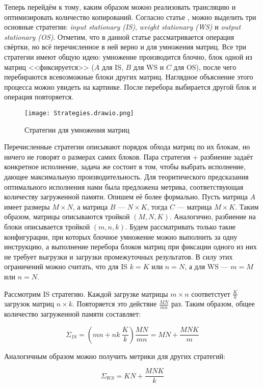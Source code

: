Теперь перейдём к тому, каким образом можно реализовать трансляцию и
оптимизировать количество копирований. Согласно статье \cite{matmul-strategies}, можно выделить
три основные стратегии: \textit{input stationary (IS)}, \textit{weight stationary (WS)}
и \textit{output stationary (OS)}. Отметим, что в данной статье рассматривается
операция свёртки, но всё перечисленное в ней верно и для умножения матриц.
Все три стратегии имеют общую идею: умножение производится блочно, блок одной из
матриц <<фиксируется>> ($A$ для IS, $B$ для WS и $C$ для OS), после чего
перебираются всевозможные блоки других матриц. Наглядное объяснение этого
процесса можно увидеть на картинке. После перебора выбирается другой блок и
операция повторяется.

\begin{figure}[h!]
    \centering
    \texttt{[image: Strategies.drawio.png]}
    \caption{Стратегии для умножения матриц}
\end{figure}

Перечисленные стратегии описывают порядок обхода матриц по их блокам, но ничего
не говорят о размерах самих блоков. Пара стратегия + разбиение задаёт конкретное
исполнение, задача же состоит в том, чтобы выбрать исполнение, дающее
максимальную производительность. Для теоритического предсказания оптимального
исполнения нами была предложена метрика, соответствующая количеству загруженной
памяти. Опишем её более формально. Пусть матрица $A$ имеет размеры $M \times N$, а
матрица $B$ --- $N \times K$, тогда $C$ --- матрица $M \times K$. Таким образом,
матрицы описываются тройкой $(M, N, K)$. Аналогично, разбиение на блоки
описывается тройкой $(m, n, k)$. Будем рассматривать только такие конфигурации,
при которых блочное умножение можно выполнить за одну инструкцию, а выполнение
перебора блоков матриц при фиксации одного из них не требует выгрузки и загрузки
промежуточных результатов. В силу этих ограничений можно считать, что для IS
$k = K$ или $n = N$, а для WS --- $m = M$ или $n = N$.

Рассмотрим IS стратегию. Каждой загрузке матрицы $m \times n$ соответстует
$\frac{K}{k}$ загрузок матриц $n \times k$. Повторяется это действие
$\frac{MN}{mn}$ раз. Таким образом, общее количество загруженной памяти
составляет:

\[
    \Sigma_{IS} = \left( mn + nk ~ \frac{K}{k} \right) \frac{MN}{mn} = MN + \frac{MNK}{m}
\]

Аналогичным образом можно получить метрики для других стратегий:

\[
    \Sigma_{WS} = KN + \frac{MNK}{k}
\]

